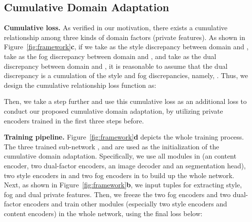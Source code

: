 \documentclass[10pt,twocolumn,letterpaper]{article}
\newcommand{\heading}[1]{\noindent\textbf{#1}}
\begin{document}
\subsection{Cumulative Domain Adaptation}



\heading{Cumulative loss.}
As verified in our motivation, 
there exists a cumulative relationship among three kinds of domain factors (private features). As shown in Figure~\ref{fig:framework}\textbf{c}, if we take  as the style discrepancy between domain  and , take  as the fog discrepancy between domain  and , and take  as the dual discrepancy between domain  and , it is reasonable to assume that the dual discrepancy is a cumulation of the style and fog discrepancies, namely, 
. 
Thus, we design the cumulative relationship loss function as:

Then, we take a step further and use this cumulative loss  as an additional loss to conduct our proposed cumulative domain adaptation, by utilizing private encoders trained in the first three steps before.





\heading{Training pipeline.}
Figure~\ref{fig:framework}\textbf{d} depicts the whole training process.
The three trained sub-network ,  and  are used as the initialization of the cumulative domain adaptation. Specifically, we use all modules in  (an content encoder, two dual-factor encoders, an image decoder and an segmentation head), two style encoders in  and two fog encoders in  to build up the whole network. Next, as shown in Figure~\ref{fig:framework}\textbf{b}, we input  tuples for extracting style, fog and dual private features. Then, we freeze the two fog encoders and two dual-factor encoders and train other modules (especially two style encoders and content encoders) in the whole network, using the final loss below: 
\vspace{-2mm}
\end{document}
